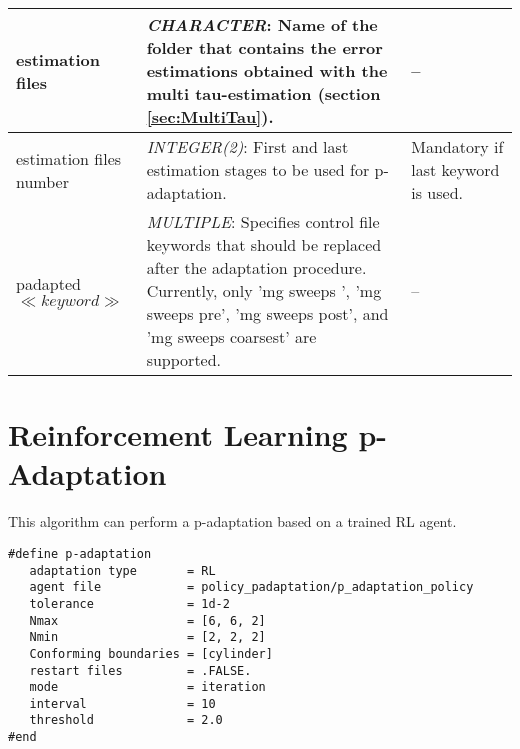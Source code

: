 \documentclass[a4paper,10pt]{report}
\begin{document}
\begin{longtable}{|p{4cm}|p{10cm}|p{2.2cm}|}
estimation files &
			\textit{CHARACTER}: Name of the folder that contains the error estimations obtained with the multi tau-estimation (section \ref{sec:MultiTau}). &
					-- \\ \hline

estimation files number &
			\textit{INTEGER(2)}: First and last estimation stages to be used for p-adaptation. &
					Mandatory if last keyword is used. \\ \hline

padapted $\ll \textit{keyword} \gg$ &
			\textit{MULTIPLE}: Specifies control file keywords that should be replaced after the adaptation procedure. Currently, only 'mg sweeps         ', 'mg sweeps pre', 'mg sweeps post', and 'mg sweeps coarsest' are supported. &
					-- \\ \hline

\end{longtable}

\section{Reinforcement Learning p-Adaptation}
This algorithm can perform a p-adaptation based on a trained RL agent.

\begin{lstlisting}
#define p-adaptation
   adaptation type       = RL
   agent file            = policy_padaptation/p_adaptation_policy
   tolerance             = 1d-2
   Nmax                  = [6, 6, 2]
   Nmin                  = [2, 2, 2]
   Conforming boundaries = [cylinder]
   restart files         = .FALSE.
   mode                  = iteration
   interval              = 10
   threshold             = 2.0
#end
\end{lstlisting}
\end{document}
